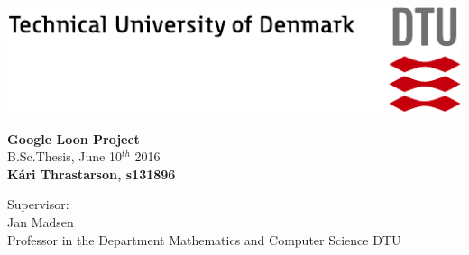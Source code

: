 \begin{titlepage}

\thispagestyle{empty}
\enlargethispage{1.3cm}

\vspace*{-1.9cm}
	
\includegraphics[width=\textwidth]{graphics/tex_dtu_uk_a1_cmyk.pdf}
	

\begin{raggedleft}

		
\Huge\textbf{Google Loon Project}\\[0.5cm]

\large{B.Sc.Thesis, June 10$^{th}$ 2016}\\[0.5cm]

\large \textbf{K\'ari Thrastarson, s131896}\\[1.5cm]		
\end{raggedleft}			
\begin{raggedright}
\large Supervisor: \\
\Large Jan Madsen\\ 
\large Professor in the Department Mathematics and Computer Science DTU
\end{raggedright}


\end{titlepage}
	